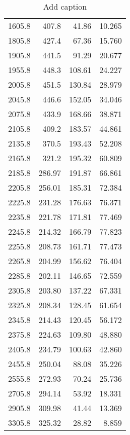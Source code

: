 \begin{table}[htbp]
  \centering
  \caption{Add caption}
    \begin{tabular}{rrrr}
    1605.8 & 407.8 & 41.86  & 10.265  \\
    1805.8 & 427.4 & 67.36  & 15.760  \\
    1905.8 & 441.5 & 91.29  & 20.677  \\
    1955.8 & 448.3 & 108.61  & 24.227  \\
    2005.8 & 451.5 & 130.84  & 28.979  \\
    2045.8 & 446.6 & 152.05  & 34.046  \\
    2075.8 & 433.9 & 168.66  & 38.871  \\
    2105.8 & 409.2 & 183.57  & 44.861  \\
    2135.8 & 370.5 & 193.43  & 52.208  \\
    2165.8 & 321.2 & 195.32  & 60.809  \\
    2185.8 & 286.97  & 191.87  & 66.861  \\
    2205.8 & 256.01  & 185.31  & 72.384  \\
    2225.8 & 231.28  & 176.63  & 76.371  \\
    2235.8 & 221.78  & 171.81  & 77.469  \\
    2245.8 & 214.32  & 166.79  & 77.823  \\
    2255.8 & 208.73  & 161.71  & 77.473  \\
    2265.8 & 204.99  & 156.62  & 76.404  \\
    2285.8 & 202.11  & 146.65  & 72.559  \\
    2305.8 & 203.80  & 137.22  & 67.331  \\
    2325.8 & 208.34  & 128.45  & 61.654  \\
    2345.8 & 214.43  & 120.45  & 56.172  \\
    2375.8 & 224.63  & 109.80  & 48.880  \\
    2405.8 & 234.79  & 100.63  & 42.860  \\
    2455.8 & 250.04  & 88.08  & 35.226  \\
    2555.8 & 272.93  & 70.24  & 25.736  \\
    2705.8 & 294.14  & 53.92  & 18.331  \\
    2905.8 & 309.98  & 41.44  & 13.369  \\
    3305.8 & 325.32  & 28.82  & 8.859  \\
    \end{tabular}%
  \label{tab:addlabel}%
\end{table}%
